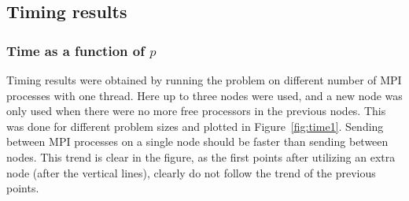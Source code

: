 \subsection{Timing results}
\subsubsection{Time as a function of $p$}
Timing results were obtained by running the problem on different number of MPI processes with one thread. Here up to three nodes were used, and a new node was only used when there were no more free processors in the previous nodes. This was done for different problem sizes and plotted in Figure~\ref{fig:time1}. Sending between MPI processes on a single node should be faster than sending between nodes. This trend is clear in the figure, as the first points after utilizing an extra node (after the vertical lines), clearly do not follow the trend of the previous points. 


